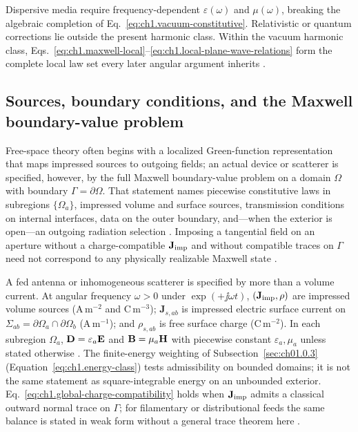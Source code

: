 Dispersive media require
frequency-dependent \(\varepsilon(\omega)\) and \(\mu(\omega)\), breaking the
algebraic completion of Eq.~\eqref{eq:ch1.vacuum-constitutive}. Relativistic or
quantum corrections lie outside the present harmonic class. Within the vacuum harmonic class,
Eqs.~\eqref{eq:ch1.maxwell-local}--\eqref{eq:ch1.local-plane-wave-relations}
form the complete local law set every later angular argument inherits
\cite{maxwell1873}.

\subsection{Sources, boundary conditions, and the Maxwell boundary-value problem}
\label{sec:ch01.1.2}

Free-space theory often begins with a localized Green-function representation that maps impressed sources to outgoing fields; an actual device or scatterer is specified, however, by the full Maxwell boundary-value problem on a domain $\Omega$ with boundary $\Gamma=\partial\Omega$. That statement names piecewise constitutive laws in subregions $\{\Omega_a\}$, impressed volume and surface sources, transmission conditions on internal interfaces, data on the outer boundary, and---when the exterior is open---an outgoing radiation selection \cite{stratton1941,maxwell1873}. Imposing a tangential field on an aperture without a charge-compatible $\mathbf{J}_{\mathrm{imp}}$ and without compatible traces on $\Gamma$ need not correspond to any physically realizable Maxwell state \cite{harrington2001,chu1948}.

A fed antenna or inhomogeneous scatterer is specified by more than a volume current. At angular frequency $\omega>0$ under $\exp(+\jj\omega t)$, $(\mathbf{J}_{\mathrm{imp}},\rho)$ are impressed volume sources (A\,m$^{-2}$ and C\,m$^{-3}$); $\mathbf{J}_{s,ab}$ is impressed electric surface current on $\Sigma_{ab}=\partial\Omega_a\cap\partial\Omega_b$ (A\,m$^{-1}$); and $\rho_{s,ab}$ is free surface charge (C\,m$^{-2}$). In each subregion $\Omega_a$, $\mathbf{D}=\varepsilon_a\mathbf{E}$ and $\mathbf{B}=\mu_a\mathbf{H}$ with piecewise constant $\varepsilon_a,\mu_a$ unless stated otherwise \cite{stratton1941}. The finite-energy weighting of Subsection~\ref{sec:ch01.0.3} (Equation~\eqref{eq:ch1.energy-class}) tests admissibility on bounded domains; it is not the same statement as square-integrable energy on an unbounded exterior. Eq.~\eqref{eq:ch1.global-charge-compatibility} holds when $\mathbf{J}_{\mathrm{imp}}$ admits a classical outward normal trace on $\Gamma$; for filamentary or distributional feeds the same balance is stated in weak form without a general trace theorem here \cite{stratton1941}.

